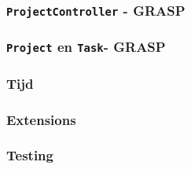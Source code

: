 \documentclass{beamer}
\begin{document}
\begin{frame}
\frametitle {\texttt{ProjectController} - GRASP}


\end{frame}

\begin{frame}
\frametitle {\texttt{Project} en \texttt{Task}- GRASP}


\end{frame}


\begin{frame}
\frametitle {Tijd}


\end{frame}

\begin{frame}
\frametitle {Extensions}


\end{frame}

\begin{frame}
\frametitle {Testing}


\end{frame}
\end{document}
